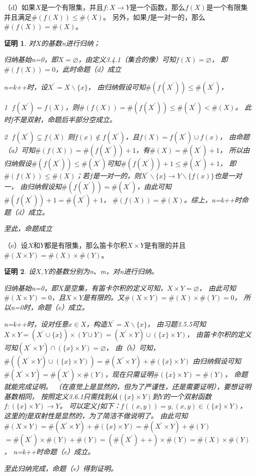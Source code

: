 \documentclass{article}
\theoremstyle{mystyle}
\theoremstyle{zproofstyle}
\newtheorem*{zproof}{证明}
\begin{document}
（d）如果$X$是一个有限集，并且$f: X \rightarrow Y$是一个函数，那么$f(X)$是一个有限集并且满足$\#(f(X)) \leq \#(X)$。
另外，如果$f$是一对一的，那么$\#(f(X)) = \#(X)$。

\begin{zproof}
  对$X$的基数n进行归纳；

  归纳基始n=0，即$X = \varnothing$，由定义3.4.1（集合的像）可知$f(X) = \varnothing$，
  即$\#(f(X)) = 0$，此时命题（d）成立

  n=k++时，设$X^\prime = X \backslash \{x\}$，
  由归纳假设可知$\#(f(X^\prime)) \leq \#(X^\prime)$，

  \textcircled{1} $f(X^\prime) = f(X)$，则$\#(f(X)) =\#(f(X^\prime)) \leq \#(X^\prime) < \#(X)$。
  此时f不是双射，命题后半部分空成立。

  \textcircled{2} $f(X^\prime) \subsetneq  f(X)$
  则$f(x) \not \in f(X^\prime)$，且$f(X) = f(X^\prime) \cup f(x)$，
  由命题（a）可知$\#(f(X))=\#(f(X^\prime)) + 1$，有$\#(X) = \#(X^\prime) + 1$，
  所以由归纳假设$\#(f(X^\prime)) \leq \#(X^\prime)$可知$\#(f(X^\prime)) + 1 \leq \#(X^\prime) + 1$，
  即$\#(f(X)) \leq \#(X)$；若$f$是一对一的，则$X^\prime \backslash \{x\} \rightarrow Y \backslash \{f(x)\}$也是一对一，
  由归纳假设知$\#(f(X^\prime)) = \#(X^\prime)$，由此可知$\#(f(X^\prime)) + 1 = \#(X^\prime) + 1$，
  $\#(f(X)) = \#(X)$。综上，n=k++时命题（d）成立。

  至此，命题成立
\end{zproof}

（e）设$X$和$Y$都是有限集，那么笛卡尔积$X \times Y$是有限的并且$\#(X \times Y) = \#(X) \times \#(Y)$。
\begin{zproof}
  设$X,Y$的基数分别为n、m，对n进行归纳。

  归纳基始n=0，即$X$是空集，有笛卡尔积的定义可知，$X \times Y = \varnothing$，
  由此可知$\#(X \times Y) = 0$，且$X \times Y$是有限的。又$\#(X \times Y) = \#(X) \times \#(Y) = 0$，
  所以n=0时，命题（e）成立。

  n=k++时，设对任意$x \in X$，构造$X^\prime = X \backslash \{x\}$，
  由习题3.5.5可知$X \times Y = (X^\prime \cup \{x\}) \times (Y \cup Y) = (X^\prime \times Y) \cup (\{x\} \times Y)$，
  由笛卡尔积的定义可知$(X^\prime \times Y) \cap (\{x\} \times Y) = \varnothing$，
  由（b）可知，$\#((X^\prime \times Y) \cup (\{x\} \times Y)) = \#(X^\prime \times Y) + \#(\{x\} \times Y)$
  由归纳假设可知$\#(X^\prime \times Y) = \#(X^\prime) \times \#(Y)$，现在只需证明$\#(\{x\} \times Y)=\#(Y)$，
  命题就能完成证明。
  （在直觉上是显然的，但为了严谨性，还是需要证明），要想证明基数相同，
  按照定义3.6.1只需找到从$(\{x\} \times Y)$到$Y$的一个双射函数$f: (\{x\} \times Y) \rightarrow Y$。
  可以定义$f$如下：$f((x,y))=y, (x,y) \in (\{x\} \times Y)$，这里的f是双射性是显然的，为了简洁不做说明了。
  由此可知$\#(X \times Y) = \#(X^\prime \times Y) + \#(\{x\} \times Y)=\#(X^\prime \times Y) + \#(Y)$
  $=\#(X^\prime) \times \#(Y) + \#(Y)=(\#(X^\prime)++) \times \#(Y) = \#(X) \times \#(Y)$，
  n=k++时命题（e）成立。

  至此归纳完成，命题（e）得到证明。

\end{zproof}
\end{document}
